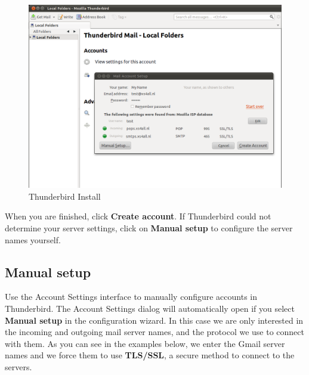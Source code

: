 \begin{figure}[htbp]
\centering
\includegraphics{thunderbird_conf_2.png}
\caption{Thunderbird Install}
\end{figure}

When you are finished, click \textbf{Create account}. If Thunderbird
could not determine your server settings, click on \textbf{Manual setup}
to configure the server names yourself.

\subsection{Manual setup}

Use the Account Settings interface to manually configure accounts in
Thunderbird. The Account Settings dialog will automatically open if you
select \textbf{Manual setup} in the configuration wizard. In this case
we are only interested in the incoming and outgoing mail server names,
and the protocol we use to connect with them. As you can see in the
examples below, we enter the Gmail server names and we force them to use
\textbf{TLS/SSL}, a secure method to connect to the servers.

